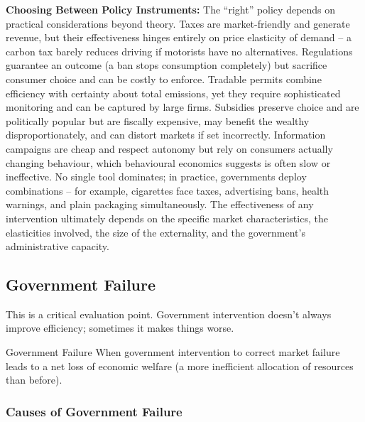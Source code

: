 \documentclass[11pt, a4paper, twoside]{book}
\begin{document}
\textbf{Choosing Between Policy Instruments:} The ``right'' policy depends on practical considerations beyond theory. Taxes are market-friendly and generate revenue, but their effectiveness hinges entirely on price elasticity of demand -- a carbon tax barely reduces driving if motorists have no alternatives. Regulations guarantee an outcome (a ban stops consumption completely) but sacrifice consumer choice and can be costly to enforce. Tradable permits combine efficiency with certainty about total emissions, yet they require sophisticated monitoring and can be captured by large firms. Subsidies preserve choice and are politically popular but are fiscally expensive, may benefit the wealthy disproportionately, and can distort markets if set incorrectly. Information campaigns are cheap and respect autonomy but rely on consumers actually changing behaviour, which behavioural economics suggests is often slow or ineffective. No single tool dominates; in practice, governments deploy combinations -- for example, cigarettes face taxes, advertising bans, health warnings, and plain packaging simultaneously. The effectiveness of any intervention ultimately depends on the specific market characteristics, the elasticities involved, the size of the externality, and the government's administrative capacity.

\subsection{Government Failure}

This is a critical evaluation point. Government intervention doesn't always improve efficiency; sometimes it makes things worse.

\begin{keyterm}{Government Failure}
When government intervention to correct market failure leads to a net loss of economic welfare (a more inefficient allocation of resources than before).
\end{keyterm}

\subsubsection{Causes of Government Failure}
\end{document}
